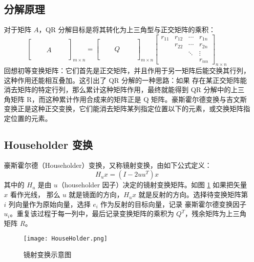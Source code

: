 \subsection{分解原理}
对于矩阵 $A$，QR 分解目标是将其转化为上三角型与正交矩阵的乘积：
\begin{equation}
    \begin{bmatrix}
        \quad & \quad & \quad \\
        \quad & \quad & \quad \\
        \quad & A     & \quad \\
        \quad & \quad & \quad \\
        \quad & \quad & \quad
    \end{bmatrix}_{m\times n}=
    \begin{bmatrix}
        \quad & \quad & \quad \\
        \quad & \quad & \quad \\
        \quad & Q     & \quad \\
        \quad & \quad & \quad \\
        \quad & \quad & \quad
    \end{bmatrix}_{m\times n}
    \begin{bmatrix}
        r_{11} & r_{12} & \cdots & r_{1n} \\
               & r_{22} & \cdots & r_{2n} \\
               &        & \ddots & \vdots \\
               &
               &        & r_{nn}
    \end{bmatrix}_{n\times n}
\end{equation}
回想初等变换矩阵：它们首先是正交矩阵，并且作用于另一矩阵后能交换其行列，这种作用还能相互叠加。这引出了 QR 分解的一种思路：如果
存在某正交矩阵能消去矩阵的特定行列，那么累计这种矩阵作用，最终就能得到 QR 分解中的上三角矩阵 R，而这种累计作用合成来的矩阵正是
Q 矩阵。豪斯霍尔德变换与吉文斯变换正是这种正交变换，它们能消去矩阵某列指定位置以下的元素，或交换矩阵指定位置的元素。

\subsection{Householder 变换}
豪斯霍尔德（Householder）变换，又称镜射变换，由如下公式定义：
\begin{equation}
    H_ux=(I-2uu^{T})x
\end{equation}
其中的 $H_u$ 是由 $u$（householder 因子）决定的镜射变换矩阵。如图 \ref{householder_transform} 如果把矢量 $x$ 看作光线，
那么 $u$ 就是镜面的方向，$H_ux$ 就是反射的方向。选择待变换矩阵第 $i$ 列向量作为原始向量，选择 $e_i$ 作为反射的目标向量，记录
豪斯霍尔德变换因子 $u_i$。重复该过程于每一列中，最后记录变换矩阵的乘积为 $Q^T$，残余矩阵为上三角矩阵 $R$。
\begin{figure}[htbp]
    \centering\label{householder_transform}
    \texttt{[image: HouseHolder.png]}
    \caption{镜射变换示意图}
\end{figure}
